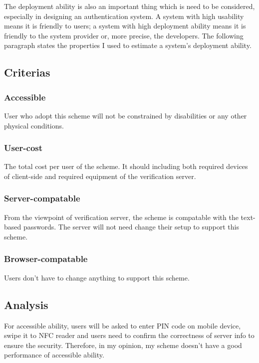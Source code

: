\begin{CJK}{Bg5}{bsmi}
The deployment ability is also an important thing which is need to be considered, especially in designing an authentication system. A system with high usability means it is friendly to users; a system with high deployment ability means it is friendly to the system provider or, more precise, the developers. The following paragraph states the properties I used to estimate a system's deployment ability.

\subsection{Criterias}

\subsubsection{Accessible}

User who adopt this scheme will not be constrained by disabilities or any other physical conditions.

\subsubsection{User-cost}

The total cost per user of the scheme. It should including both required devices of client-side and required equipment of the verification server.

\subsubsection{Server-compatable}

From the viewpoint of verification server, the scheme is compatable with the text-based passwords. The server will not need change their setup to support this scheme. 

\subsubsection{Browser-compatable}

Users don't have to change anything to support this scheme. 

\subsection{Analysis}

For accessible ability, users will be asked to enter PIN code on mobile device, swipe it to NFC reader and users need to confirm the correctness of server info to ensure the security. Therefore, in my opinion, my scheme doesn't have a good performance of accessible ability.


\end{CJK}
